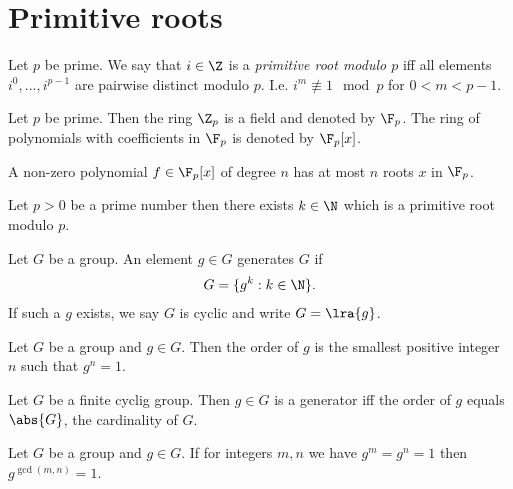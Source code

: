 \documentclass{article}
\begin{document}
\section{Primitive roots}

\begin{definition}
    Let $p$ be prime. We say that $i\in\Z$ is a \emph{primitive root modulo $p$}
    iff all elements $i^0,...,i^{p-1}$ are pairwise distinct modulo $p$. I.e.
    $i^m\not\equiv 1\mod p$ for $0<m<p-1$.
\end{definition}

\begin{definition}
    Let $p$ be prime. Then the ring $\Z_p$ is a field and denoted by $\F_p$.
    The ring of polynomials with coefficients in $\F_p$ is denoted by $\F_p[x]$.
\end{definition}

\begin{theorem}
    A non-zero polynomial $f\in\F_p[x]$ of degree $n$ has at most $n$ roots $x$ 
    in $\F_p$.
\end{theorem}

\begin{theorem}
    Let $p>0$ be a prime number then there exists $k\in\N$ which is a
    primitive root modulo $p$. 
\end{theorem}

\begin{definition}
    Let $G$ be a group. An element $g\in G$ generates $G$ if
    \begin{align*}
        G = \{g^k : k \in \N\}.
    \end{align*}
    If such a $g$ exists, we say $G$ is cyclic and write $G=\lra{g}$.
\end{definition}

\begin{definition}
    Let $G$ be a group and $g\in G$. Then the order of $g$ is the smallest positive 
    integer $n$ such that $g^n = 1$.
\end{definition}

\begin{corollary}
    Let $G$ be a finite cyclig group. Then $g\in G$ is a generator iff the order of 
    $g$ equals $\abs{G}$, the cardinality of $G$.
\end{corollary}

\begin{lemma}
    Let $G$ be a group and $g\in G$. If for integers $m,n$ we have $g^m=g^n=1$
    then $g^{\gcd(m,n)}=1$.
\end{lemma}
\end{document}
